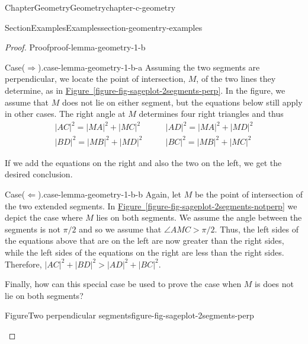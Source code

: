 \documentclass[oneside,10pt,]{book}
\newcommand{\xreffont}{\relax}
\numberwithin{equation}{section}
\newcommand{\gt}{>}
\begin{document}
\begin{chapterptx}{Chapter}{Geometry}{}{Geometry}{}{}{chapter-c-geometry}
\begin{sectionptx}{Section}{Examples}{}{Examples}{}{}{section-geomentry-examples}
\begin{proof}{Proof}{}{proof-lemma-geometry-1-b}
\begin{case}{Case}{}{(\(\Rightarrow\)).}{case-lemma-geometry-1-b-a}
Assuming the two segments are perpendicular, we locate the point of intersection, \(M\), of the two lines they determine, as in \hyperref[figure-fig-sageplot-2segments-perp]{Figure~{\xreffont\ref{figure-fig-sageplot-2segments-perp}}}.  In the figure, we assume that \(M\) does not lie on either segment, but the equations below still apply in other cases. The right angle at \(M\) determines four right triangles and thus%
\begin{equation*}
\begin{split}
\lvert AC\rvert^2 = \lvert MA\rvert^2 +\lvert  MC\rvert^2 
\qquad &\lvert AD\rvert^2 =\lvert  MA\rvert^2 + \lvert MD\rvert^2 \\
\lvert BD\rvert^2 = \lvert MB\rvert^2 +\lvert MD\rvert^2 
\qquad &\lvert BC\rvert^2 = \lvert MB\rvert^2 + \lvert MC\rvert^2
\end{split}
\end{equation*}
%
\par
If we add the equations on the right and also the two on the left, we get the desired conclusion.%
\end{case}
\begin{case}{Case}{}{(\(\Leftarrow\)).}{case-lemma-geometry-1-b-b}
Again, let \(M\) be the point of intersection of the two extended segments.  In  \hyperref[figure-fig-sageplot-2segments-notperp]{Figure~{\xreffont\ref{figure-fig-sageplot-2segments-notperp}}} we depict the case where \(M\) lies on both segments.  We assume the angle between the segments is not \(\pi/2\) and so we assume that \(\angle AMC \gt \pi/2\).  Thus, the left sides of the equations above that are on the left are now greater than the right sides, while the left sides of the equations on the right are less than the right sides.  Therefore, \(\lvert AC \rvert^2 +  \lvert BD \rvert^2 \gt \lvert AD \rvert^2 + \lvert BC \rvert^2\).%
\par
Finally, how can this special case be used to prove the case when \(M\) is does not lie on both segments?%
\end{case}
\begin{sidebyside}{2}{0}{0}{0}%
\begin{sbspanel}{0.5}%
\begin{figureptx}{Figure}{Two perpendicular segments}{figure-fig-sageplot-2segments-perp}{}%

\end{figureptx}
\end{sbspanel}
\end{sidebyside}
\end{proof}
\end{sectionptx}
\end{chapterptx}
\end{document}
